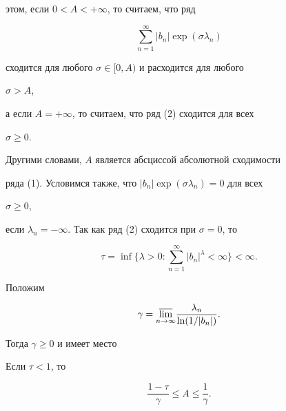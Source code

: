 этом, если $0<A<+\infty$, то считаем, что ряд 


\begin{equation} 


\sum^\infty_{n=1}|b_n|\exp(\sigma\lambda_n) 


\end{equation} 


сходится для любого $\sigma\in[0,A)$ и расходится для любого 


$\sigma>A$, 


а если $A=+\infty$, то считаем, что ряд (2) сходится для всех 


$\sigma\ge 0$. 


Другими словами, $A$ является абсциссой абсолютной сходимости 


ряда (1). Условимся также, что $|b_n|\exp(\sigma\lambda_n)=0$ для всех 


$\sigma\ge 0$, 


если $\lambda_n=-\infty$. Так как ряд (2) сходится при $\sigma=0$, то 


$$ 


\tau=\inf\biggl\{\lambda>0:\sum^\infty_{n=1}|b_n|^\lambda<\infty 


\biggr\}<\infty. 


$$ 


Положим 


$$ 


\gamma=\underset{n\to\infty}{\varlimsup} 


\frac{\lambda_n}{\ln(1/|b_n|)}. 


$$ 


Тогда $\gamma\ge 0$ и имеет место 


 


\begin{lem} Если $\tau<1$, то 


\begin{equation} 


\frac{1-\tau}{\gamma}\le A\le\frac{1}{\gamma}. 


\end{equation} 


\end{lem} 


 


